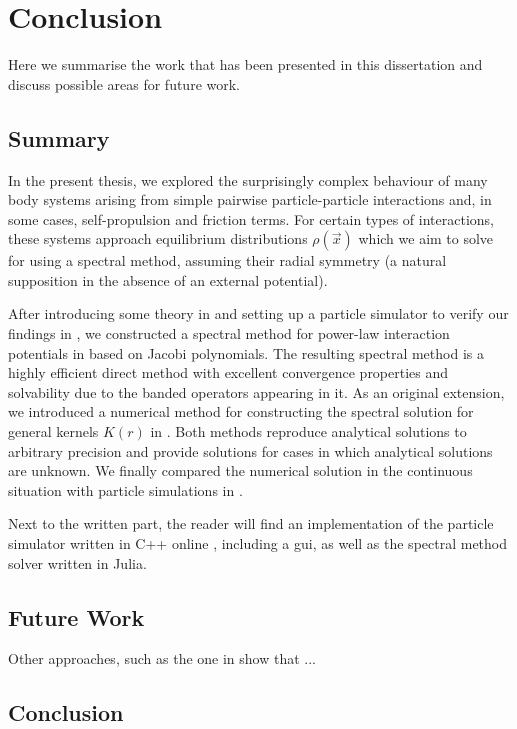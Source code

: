 \chapter{Conclusion}
\label{chap:conclusion}

Here we summarise the work that has been presented in this dissertation and discuss possible areas for future work.

\section{Summary}

In the present thesis, we explored the surprisingly complex behaviour of many body systems arising from simple pairwise particle-particle interactions and, in some cases, self-propulsion and friction terms.
For certain types of interactions, these systems approach equilibrium distributions $\rho(\vec{x})$ which we aim to solve for using a spectral method, assuming their radial symmetry (a natural supposition in the absence of an external potential).

After introducing some theory in  and setting up a particle simulator to verify our findings in , we constructed a spectral method for power-law interaction potentials in  based on Jacobi polynomials.
The resulting spectral method is a highly efficient direct method with excellent convergence properties and solvability due to the banded operators appearing in it.
As an original extension, we introduced a numerical method for constructing the spectral solution for general kernels $K(r)$ in .
Both methods reproduce analytical solutions to arbitrary precision and provide solutions for cases in which analytical solutions are unknown.
We finally compared the numerical solution in the continuous situation with particle simulations in .

Next to the written part, the reader will find an implementation of the particle simulator written in C++ online \parencite{2023-my-dissertation}, including a \gls{gui}, as well as the spectral method solver written in Julia.

\section{Future Work}
Other approaches, such as the one in \cite{2015-spectral-method-for-boltzmann-equation} show that ...
\hierKoennteIhreWerbungStehen

\section{Conclusion}
\hierKoennteIhreWerbungStehen
